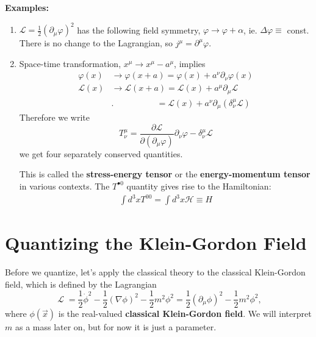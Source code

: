 \documentclass{report}
\theoremstyle{plain}
\theoremstyle{definition}
\theoremstyle{remark}
\newcommand{\FR}[2]{\frac{#1}{#2}}
\newcommand{\mc}{\mathcal}
\newcommand{\vphi}{\varphi}
\newcommand{\di}{\partial}
\newcommand{\ddi}[2]{\FR{\partial {#1}}{\partial {#2}}}
\DeclareMathOperator{\cL}{\mathcal{L}}
\begin{document}
\textbf{Examples:}
\begin{enumerate}
    \item $\mc L = \FR{1}{2}(\di_\mu \vphi)^2$ has the following field
        symmetry, $\vphi \to \vphi+\alpha$, ie. $\Delta\vphi \equiv$ const.
        There is no change to the Lagrangian, so $j^\mu = \di^\mu \vphi$.
    \item Space-time transformation, $x^\mu \to x^\mu-a^\mu$, implies
        \begin{align*}
        \vphi(x) &\to \vphi(x+a) = \vphi(x) + a^\nu\di_\nu\vphi(x)\\
        \mc L(x) &\to \mc L(x+a) = \mc L(x) + a^\mu\di_\mu \mc L\\
                 &. \quad\qquad\qquad = \mc L(x) +
                 a^\nu\di_\mu(\delta^\mu_\nu \mc L)
        \end{align*}
        Therefore we write 
        \[T^\mu_\nu = \ddi{\mc L}{(\di_\mu\vphi)}\di_\nu\vphi -
        \delta^\mu_\nu\mc L\]
        we get four separately conserved quantities.

        This is called the {\bf stress-energy tensor} or the {\bf
          energy-momentum tensor} in various contexts. The $T^{\bullet
          0}$ quantity gives rise to the Hamiltonian:
        \begin{align*}
            \int d^3x T^{00} = \int d^3x \mc H \equiv H
        \end{align*}

\end{enumerate}


\section{Quantizing the Klein-Gordon Field}

Before we quantize, let's apply the classical theory to the classical
Klein-Gordon field, which is defined by the Lagrangian
$$ \cL = \frac{1}{2} \dot\phi^2 - \frac{1}{2} (\nabla \phi)^2 -
\frac{1}{2} m^2 \phi^2 = \frac{1}{2} (\partial_\mu \phi)^2 -
\frac{1}{2} m^2 \phi^2, $$ where $\phi(\vec{x})$ is the real-valued
     {\bf classical Klein-Gordon field}. We will interpret $m$ as a
     mass later on, but for now it is just a parameter.
\end{document}
